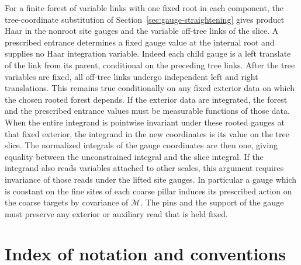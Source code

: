 \documentclass[11pt,letterpaper,reqno]{amsart}
\numberwithin{equation}{section}
\theoremstyle{definition}
\theoremstyle{remark}
\begin{document}
For a finite forest of variable links with one fixed root in each
component, the tree-coordinate substitution of
Section~\ref{sec:gauge-straightening} gives product Haar
in the nonroot site gauges and the variable off-tree links of the slice.
A prescribed entrance determines a fixed gauge value at the internal
root and supplies no Haar integration variable.
Indeed each child gauge is a left translate of the link from
its parent, conditional on the preceding tree links. After the
tree variables are fixed, all off-tree links undergo independent
left and right translations. This remains true conditionally
on any fixed exterior data on which the chosen rooted forest
depends. If the exterior data are integrated, the forest and the
prescribed entrance values must be measurable functions of those data.
When the entire integrand is pointwise invariant under these
rooted gauges at that fixed exterior, the integrand in the
new coordinates is its value on the tree slice. The normalized
integrals of the gauge coordinates are then one, giving equality
between the unconstrained integral and the slice integral.
If the integrand also reads variables attached to other scales,
this argument requires invariance of those reads under the
lifted site gauges. In particular a gauge which is constant on
the fine sites of each coarse pillar induces its prescribed
action on the coarse targets by covariance of \(\mathcal M\).
The pins and the support of the gauge must preserve any exterior
or auxiliary read that is held fixed.

\clearpage
\appendix
\section{Index of notation and conventions}\label{app:notation}
\end{document}
